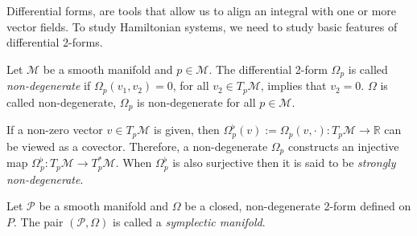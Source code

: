 Differential forms, are tools that allow us to align an integral with one or more vector fields. To study Hamiltonian systems, we need to study basic features of differential 2-forms.

\begin{definition}
	Let $\mathcal M$ be a smooth manifold and $p\in \mathcal M$. The differential 2-form $\Omega_p$ is called \emph{non-degenerate} if $\Omega_p(v_1,v_2)=0$, for all $v_2\in T_p \mathcal M$, implies that $v_2 = 0$. $\Omega$ is called non-degenerate, $\Omega_p$ is non-degenerate for all $p\in \mathcal M$.
\end{definition}
If a non-zero vector $v\in T_p \mathcal M$ is given, then $\Omega_p^{\flat}(v):=\Omega_p(v,\cdot):T_p \mathcal M \to \mathbb R$ can be viewed as a covector. Therefore, a non-degenerate $\Omega_p$ constructs an injective map $\Omega_p^{\flat}:T_p\mathcal M \to T_p^* \mathcal M$. When $\Omega_p^{\flat}$ is also surjective then it is said to be \emph{strongly non-degenerate}.

\begin{definition}
	Let $\mathcal P$ be a smooth manifold and $\Omega$ be a closed, non-degenerate 2-form defined on $P$. The pair $(\mathcal P,\Omega)$ is called a \emph{symplectic manifold}.
\end{definition}


